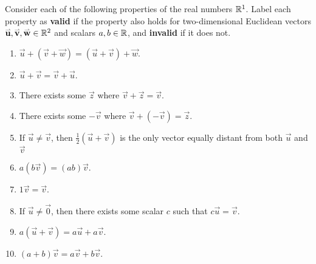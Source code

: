 
\begin{applicationActivities}


\begin{activity}{20}\smallSlideText
Consider each of the following properties of the real numbers
\(\mathbb{R}^1\). Label each property as \textbf{valid} if the property also
holds for two-dimensional Euclidean vectors 
\(\mathbf{\accentset{\rightharpoonup}{u}},\mathbf{\accentset{\rightharpoonup}{v}},\mathbf{\accentset{\rightharpoonup}{w}}\in\mathbb{R}^2\) and scalars \(a,b\in\mathbb{R}\),
and \textbf{invalid} if it does not.
\begin{multicols}{2}
\begin{enumerate}
  \item \(\vec u+(\vec v+\vec w)=
        (\vec u+\vec v)+\vec w\).
  \item \(\vec u+\vec v=
        \vec v+\vec u\).
  \item There exists some \(\vec z\)
        where \(\vec v+\vec z=\vec v\).
  \item There exists some \(-\vec v\)
        where \(\vec v+(-\vec v)=\vec z\).
  \item If \(\vec u\not=\vec v\), then \(\frac{1}{2}(\vec u+\vec v)\)
        is the only vector equally distant from both \(\vec u\) and \(\vec v\)
  \item \(a(b\vec v)=(ab)\vec v\).
  \item \(1\vec v=\vec v\).
  \item If \(\vec u\not=\vec 0\), then there exists some scalar \(c\) 
        such that \(c\vec u=\vec v\).
  \item \(a(\vec u+\vec v)=a\vec u+a\vec v\).
  \item \((a+b)\vec v=a\vec v+b\vec v\).
\end{enumerate}
\end{multicols}
\end{activity}


\end{applicationActivities}
